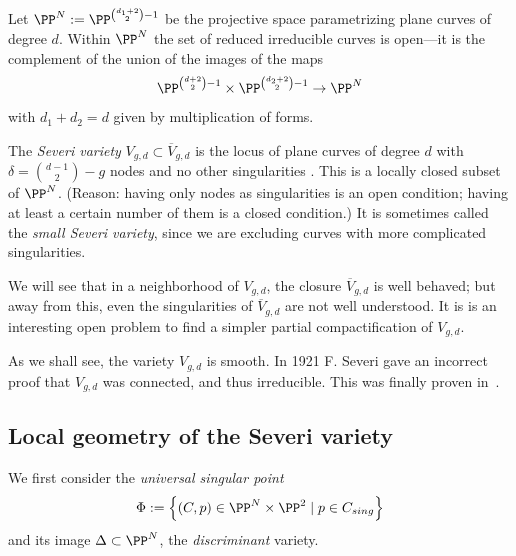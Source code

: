 \def\Vdg{{V_{g,d}}}
\def\Vdgbar{{\overline{V}_{g,d}}} 

Let $\PP^N := \PP^{{d_1+2\choose 2} - 1}$ be the projective space parametrizing plane curves of degree $d$.
Within $\PP^N$ the set of reduced irreducible curves is open---it is the complement of the union of the images of the maps 
$$
\PP^{{d+2\choose 2} - 1}\times\PP^{{d_2+2\choose 2}-1} \to \PP^N
$$ 
with $d_1+d_2 = d$ given by multiplication of forms. 

\begin{propdef}
The \emph{Severi variety} $V_{g,d} \subset \Vdgbar$ is the locus of plane curves of degree $d$ with $\delta = \binom{d-1}{2} - g$ nodes and no other singularities . This is a locally closed subset of $\PP^N$.
(Reason: having only nodes as singularities is an open condition; having at least a certain number of them
is a closed condition.)
It is sometimes
called the \emph{small Severi variety}, since we are excluding curves with more complicated singularities.
\end{propdef}


We will see that in a neighborhood of  $ {V}_{g,d}$,  the closure $\overline V_{g,d}$  is well behaved; but away from this,
even the singularities of $\overline V_{g,d}$  are not well understood. It is is an interesting open problem to find a simpler partial compactification of $ V_{g,d}$. 


\begin{fact}\label{severi irreducible}
As we shall see, the variety $V_{g,d}$ is smooth. In 1921 F. Severi gave an incorrect proof that $\Vdg$ was connected, and thus irreducible. This was finally proven in~\cite{MR837522}.
\end{fact}


\subsection{Local geometry of the Severi variety}\label{local severi geometry}

We first consider the \emph{universal singular point}
$$
\Phi := \left\{ (C, p) \in \PP^N \times \PP^2 \mid p \in C_{sing} \right\}
$$
and its image $\Delta\subset \PP^N$, the \emph{discriminant} variety. 

